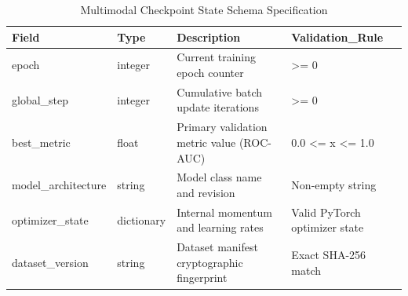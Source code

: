 \begin{table}
\caption{Multimodal Checkpoint State Schema Specification}
\begin{tabular}{llll}
\toprule
Field & Type & Description & Validation_Rule \\
\midrule
epoch & integer & Current training epoch counter & >= 0 \\
global_step & integer & Cumulative batch update iterations & >= 0 \\
best_metric & float & Primary validation metric value (ROC-AUC) & 0.0 <= x <= 1.0 \\
model_architecture & string & Model class name and revision & Non-empty string \\
optimizer_state & dictionary & Internal momentum and learning rates & Valid PyTorch optimizer state \\
dataset_version & string & Dataset manifest cryptographic fingerprint & Exact SHA-256 match \\
\bottomrule
\end{tabular}
\end{table}
